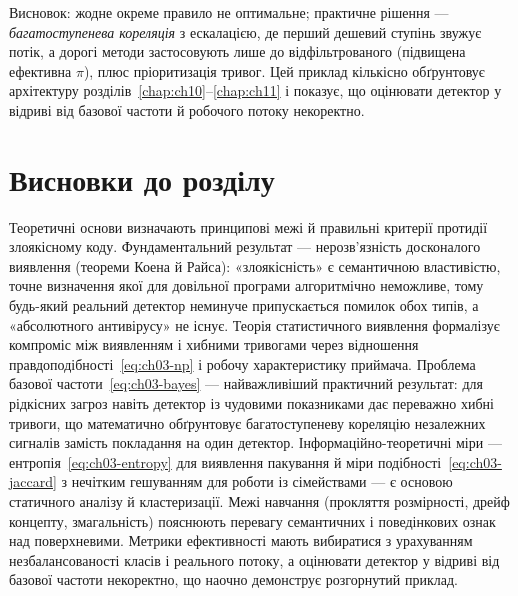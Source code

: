 Висновок: жодне окреме правило не оптимальне; практичне рішення --- \emph{багатоступенева кореляція} з ескалацією, де перший дешевий ступінь звужує потік, а дорогі методи застосовують лише до відфільтрованого (підвищена ефективна $\pi$), плюс пріоритизація тривог. Цей приклад кількісно обґрунтовує архітектуру розділів~\ref{chap:ch10}--\ref{chap:ch11} і показує, що оцінювати детектор у відриві від базової частоти й робочого потоку некоректно.

\section*{Висновки до розділу}

Теоретичні основи визначають принципові межі й правильні критерії протидії злоякісному коду. Фундаментальний результат --- нерозв'язність досконалого виявлення (теореми Коена й Райса): «злоякісність» є семантичною властивістю, точне визначення якої для довільної програми алгоритмічно неможливе, тому будь-який реальний детектор неминуче припускається помилок обох типів, а «абсолютного антивірусу» не існує. Теорія статистичного виявлення формалізує компроміс між виявленням і хибними тривогами через відношення правдоподібності~\eqref{eq:ch03-np} і робочу характеристику приймача. Проблема базової частоти~\eqref{eq:ch03-bayes} --- найважливіший практичний результат: для рідкісних загроз навіть детектор із чудовими показниками дає переважно хибні тривоги, що математично обґрунтовує багатоступеневу кореляцію незалежних сигналів замість покладання на один детектор. Інформаційно-теоретичні міри --- ентропія~\eqref{eq:ch03-entropy} для виявлення пакування й міри подібності~\eqref{eq:ch03-jaccard} з нечітким гешуванням для роботи із сімействами --- є основою статичного аналізу й кластеризації. Межі навчання (прокляття розмірності, дрейф концепту, змагальність) пояснюють перевагу семантичних і поведінкових ознак над поверхневими. Метрики ефективності мають вибиратися з урахуванням незбалансованості класів і реального потоку, а оцінювати детектор у відриві від базової частоти некоректно, що наочно демонструє розгорнутий приклад.

